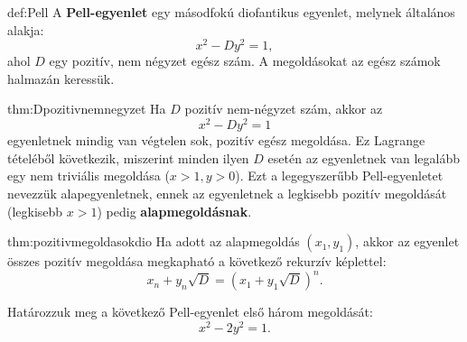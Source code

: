 \begin{definition}{def:Pell}
A \textbf{Pell-egyenlet} egy másodfokú diofantikus egyenlet, melynek
általános alakja: 
\[
x^{2}-Dy^{2}=1,
\]
ahol $D$ egy pozitív, nem négyzet egész szám. A megoldásokat az egész
számok halmazán keressük.
\end{definition}
\begin{theorem}{thm:Dpozitivnemnegyzet}
Ha $D$ pozitív nem-négyzet szám, akkor az 
\[
x^{2}-Dy^{2}=1
\]
egyenletnek mindig van végtelen sok, pozitív egész megoldása. Ez Lagrange
tételéből következik, miszerint minden ilyen $D$ esetén az egyenletnek
van legalább egy nem triviális megoldása ($x>1,y>0$). Ezt a legegyszerűbb
Pell-egyenletet nevezzük alapegyenletnek, ennek az egyenletnek a legkisebb
pozitív megoldását (legkisebb $x>1$) pedig \textbf{alapmegoldásnak}.
\end{theorem}

\begin{theorem}{thm:pozitivmegoldasokdio}
Ha adott az alapmegoldás $(x_{1},y_{1})$, akkor az egyenlet összes
pozitív megoldása megkapható a következő rekurzív képlettel: 
\[
x_{n}+y_{n}\sqrt{D}=(x_{1}+y_{1}\sqrt{D})^{n}.
\]
\end{theorem}

\begin{problem}
Határozzuk meg a következő Pell-egyenlet első három megoldását: 
\[
x^{2}-2y^{2}=1.
\]
\end{problem}


